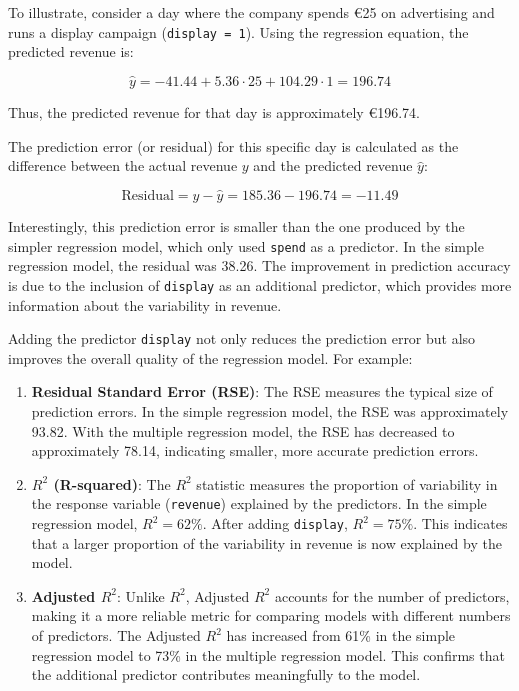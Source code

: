 \documentclass[
]{book}
\newcommand{\passthrough}[1]{#1}
\theoremstyle{definition}
\theoremstyle{definition}
\theoremstyle{definition}
\theoremstyle{definition}
\theoremstyle{remark}
\begin{document}
To illustrate, consider a day where the company spends €25 on advertising and runs a display campaign (\passthrough{\lstinline!display = 1!}). Using the regression equation, the predicted revenue is:

\[
\hat{y} = -41.44 + 5.36 \cdot 25 + 104.29 \cdot 1 = 196.74
\]

Thus, the predicted revenue for that day is approximately €196.74.

The prediction error (or residual) for this specific day is calculated as the difference between the actual revenue \(y\) and the predicted revenue \(\hat{y}\):

\[
\text{Residual} = y - \hat{y} = 185.36 - 196.74 = -11.49
\]

Interestingly, this prediction error is smaller than the one produced by the simpler regression model, which only used \passthrough{\lstinline!spend!} as a predictor. In the simple regression model, the residual was 38.26. The improvement in prediction accuracy is due to the inclusion of \passthrough{\lstinline!display!} as an additional predictor, which provides more information about the variability in revenue.

Adding the predictor \passthrough{\lstinline!display!} not only reduces the prediction error but also improves the overall quality of the regression model. For example:

\begin{enumerate}
\def\labelenumi{\arabic{enumi}.}
\item
  \textbf{Residual Standard Error (RSE)}: The RSE measures the typical size of prediction errors. In the simple regression model, the RSE was approximately 93.82. With the multiple regression model, the RSE has decreased to approximately 78.14, indicating smaller, more accurate prediction errors.
\item
  \textbf{\(R^2\) (R-squared)}: The \(R^2\) statistic measures the proportion of variability in the response variable (\passthrough{\lstinline!revenue!}) explained by the predictors. In the simple regression model, \(R^2 = 62\%\). After adding \passthrough{\lstinline!display!}, \(R^2 = 75\%\). This indicates that a larger proportion of the variability in revenue is now explained by the model.
\item
  \textbf{Adjusted \(R^2\)}: Unlike \(R^2\), Adjusted \(R^2\) accounts for the number of predictors, making it a more reliable metric for comparing models with different numbers of predictors. The Adjusted \(R^2\) has increased from 61\% in the simple regression model to 73\% in the multiple regression model. This confirms that the additional predictor contributes meaningfully to the model.
\end{enumerate}
\end{document}
